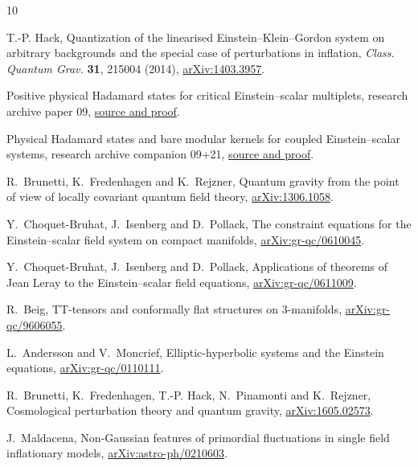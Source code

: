 \documentclass[11pt]{article}
\numberwithin{equation}{section}
\begin{document}
\begin{thebibliography}{10}
\small\setlength{\itemsep}{1pt}

T.-P. Hack, Quantization of the linearised Einstein--Klein--Gordon
system on arbitrary backgrounds and the special case of perturbations
in inflation, \emph{Class. Quantum Grav.} \textbf{31}, 215004 (2014),
\href{https://arxiv.org/abs/1403.3957}{arXiv:1403.3957}.

Positive physical Hadamard states for critical Einstein--scalar
multiplets, research archive paper 09,
\href{https://github.com/g3173028019-beep/ai-automated-quantum-gravity-research/tree/main/papers/09-canonical-einstein-scalar-hadamard}{source and proof}.

Physical Hadamard states and bare modular kernels for coupled
Einstein--scalar systems, research archive companion 09+21,
\href{https://github.com/g3173028019-beep/ai-automated-quantum-gravity-research/tree/main/papers/09-21-coupled-modular-kernel}{source and proof}.

R.~Brunetti, K.~Fredenhagen and K.~Rejzner,
Quantum gravity from the point of view of locally covariant quantum
field theory, \href{https://arxiv.org/abs/1306.1058}{arXiv:1306.1058}.

Y.~Choquet-Bruhat, J.~Isenberg and D.~Pollack,
The constraint equations for the Einstein--scalar field system on
compact manifolds, \href{https://arxiv.org/abs/gr-qc/0610045}{arXiv:gr-qc/0610045}.

Y.~Choquet-Bruhat, J.~Isenberg and D.~Pollack,
Applications of theorems of Jean Leray to the Einstein--scalar
field equations,
\href{https://arxiv.org/abs/gr-qc/0611009}{arXiv:gr-qc/0611009}.

R.~Beig, TT-tensors and conformally flat structures on 3-manifolds,
\href{https://arxiv.org/abs/gr-qc/9606055}{arXiv:gr-qc/9606055}.

L.~Andersson and V.~Moncrief,
Elliptic-hyperbolic systems and the Einstein equations,
\href{https://arxiv.org/abs/gr-qc/0110111}{arXiv:gr-qc/0110111}.

R.~Brunetti, K.~Fredenhagen, T.-P. Hack, N.~Pinamonti and K.~Rejzner,
Cosmological perturbation theory and quantum gravity,
\href{https://arxiv.org/abs/1605.02573}{arXiv:1605.02573}.

J.~Maldacena, Non-Gaussian features of primordial fluctuations in
single field inflationary models,
\href{https://arxiv.org/abs/astro-ph/0210603}{arXiv:astro-ph/0210603}.

\end{thebibliography}
\end{document}
